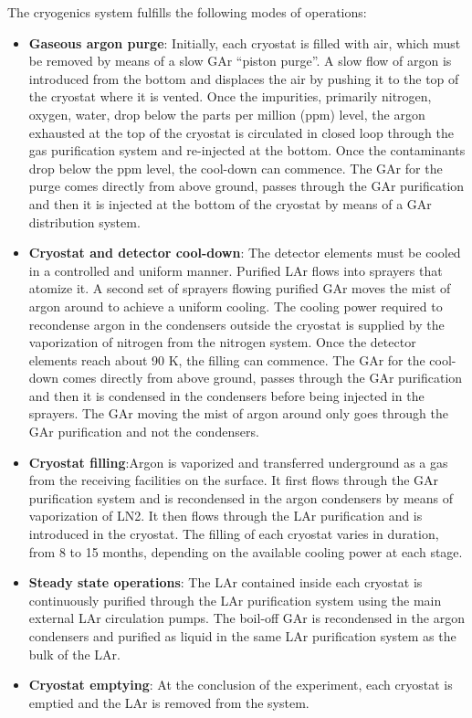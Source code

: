 The cryogenics system fulfills the following modes of operations:
\begin{itemize}
  \item {\bf Gaseous argon purge}: Initially, each cryostat is filled
    with air, which must be removed by means of a slow GAr ``piston
    purge''.  A slow flow of argon is introduced from the bottom and
    displaces the air by pushing it to the top of the cryostat where
    it is vented.  Once the impurities, primarily nitrogen, oxygen,
    water, drop below the parts per million (ppm) level, the argon
    exhausted at the top of the cryostat is circulated in closed loop
    through the gas purification system and re-injected at the
    bottom. Once the contaminants drop below the ppm level, the
    cool-down can commence. The GAr for the purge comes directly from
    above ground, passes through the GAr purification and then it is
    injected at the bottom of the cryostat by means of a GAr
    distribution system.
  \item {\bf Cryostat and detector cool-down}: The detector elements
    must be cooled in a controlled and uniform manner. Purified LAr
    flows into sprayers that atomize it. A second set of sprayers
    flowing purified GAr moves the mist of argon around to achieve a
    uniform cooling. The cooling power required to recondense argon in
    the condensers outside the cryostat is supplied by the
    vaporization of nitrogen from the nitrogen system. Once the
    detector elements reach about 90 K, the filling can commence. The
    GAr for the cool-down comes directly from above ground, passes
    through the GAr purification and then it is condensed in the
    condensers before being injected in the sprayers. The GAr moving
    the mist of argon around only goes through the GAr purification
    and not the condensers.
  \item {\bf Cryostat filling}:Argon is vaporized and transferred
    underground as a gas from the receiving facilities on the surface.
    It first flows through the GAr purification system and is
    recondensed in the argon condensers by means of vaporization of
    LN2.  It then flows through the LAr purification and is introduced
    in the cryostat. The filling of each cryostat varies in duration,
    from 8 to 15 months, depending on the available cooling power at
    each stage.
  \item{\bf Steady state operations}: The LAr contained inside each
    cryostat is continuously purified through the LAr purification
    system using the main external LAr circulation pumps. The boil-off
    GAr is recondensed in the argon condensers and purified as liquid
    in the same LAr purification system as the bulk of the LAr.
  \item{\bf Cryostat emptying}: At the conclusion of the experiment,
    each cryostat is emptied and the LAr is removed from the system.
\end{itemize}
